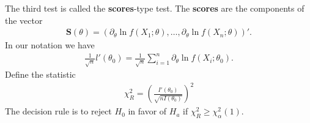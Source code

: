 \documentclass{book}
\theoremstyle{definition}
\newcommand{\p}{\partial}
\newcommand{\al}{\alpha}
\newcommand{\f}[2]{\frac{#1}{#2}}
\newcommand{\lp}{\left(}
\newcommand{\rp}{\right)}
\begin{document}
The third test is called the \textbf{scores}-type test. The \textbf{scores} are the components of the vector
\begin{align}
\mathbf{S}(\theta) = \lp \p_\theta \ln f(X_1;\theta), \dots, \p_\theta \ln f(X_n;\theta) \rp'.
\end{align}
In our notation we have
\begin{align}
\f{1}{\sqrt{n}} l'(\theta_0) = \f{1}{\sqrt{n}} \sum^n_{i=1}\p_\theta \ln f(X_i; \theta_0).
\end{align}
Define the statistic
\begin{align}
\chi^2_R = \lp \f{I'(\theta_0)}{\sqrt{n I(\theta_0)}} \rp^2
\end{align}
The decision rule is to reject $H_0$ in favor of $H_a$ if $\chi^2_R \geq \chi^2_\al(1)$.
\end{document}

